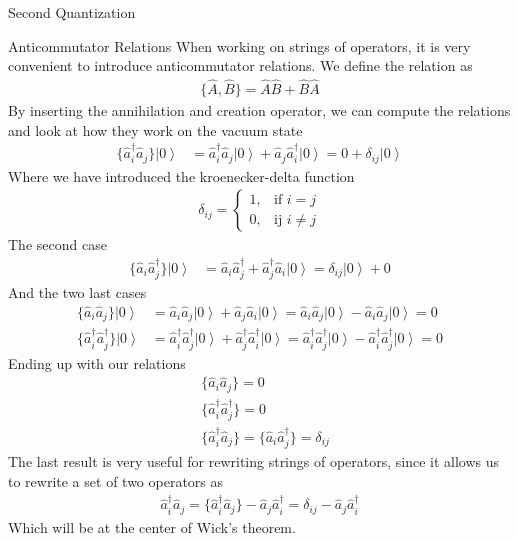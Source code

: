 \documentclass[twoside,english]{uiofysmaster}
\begin{document}
\begin{chapter}{Second Quantization}
	\begin{section}{Anticommutator Relations}
		When working on strings of operators, it is very convenient to introduce anticommutator relations. We define the relation as 
		\begin{align}
			\{ \hat A, \hat B \} = \hat A \hat B + \hat B \hat A	
		\end{align}
		By inserting the annihilation and creation operator, we can compute the relations and look at how they work on the vacuum state 
		\begin{align}
			\{ \hat a_i^\dagger \hat a_j \} \left| 0 \right>  &= \hat a_i^\dagger \hat a_j \left| 0 \right>  + \hat a_j \hat a_i^\dagger \left| 0 \right> = 0 + \delta_{ij} \left|0\right> 
 		\end{align}
 		Where we have introduced the kroenecker-delta function
 		\begin{align}
 			\delta_{ij} = \begin{cases}
 						1, & \text{if } i = j \\
 						0, & \text{ij } i \neq j
 						\end{cases}
 		\end{align}
		The second case
		\begin{align}
			\{ \hat a_i \hat a_j^\dagger \} \left| 0 \right> &= \hat a_i \hat a_j^\dagger + \hat a_j^\dagger \hat a_i \left| 0 \right> = \delta_{ij} \left| 0 \right> + 0
		\end{align}
		And the two last cases
 		\begin{align}
			\{ \hat a_i \hat a_j \} \left| 0 \right> &= \hat a_i \hat a_j \left| 0 \right> + \hat a_j \hat a_i \left| 0 \right> = \hat a_i \hat a_j \left| 0 \right> - \hat a_i \hat a_j \left| 0 \right> = 0\\
			\{ \hat a_i^\dagger \hat a_j^\dagger \} \left| 0 \right> &= \hat a_i^\dagger \hat a_j^\dagger \left| 0 \right> + \hat a_j^\dagger \hat a_i^\dagger \left| 0 \right> = \hat a_i^\dagger \hat a_j^\dagger \left| 0 \right> - \hat a_i^\dagger \hat a_j^\dagger \left| 0 \right> = 0
 		\end{align}
 		Ending up with our relations
 		\begin{align}
 			&\{ \hat a_i \hat a_j \} = 0 \\
 			&\{ \hat a_i^\dagger \hat a_j^\dagger \} = 0 \\
			&\{ \hat a_i^\dagger \hat a_j \} = \{ \hat a_i \hat a_j^\dagger \} = \delta_{ij}
		\end{align}
		The last result is very useful for rewriting strings of operators, since it allows us to rewrite a set of two operators as
		\begin{align}
			\hat a_i^\dagger \hat a_j = \{ \hat a_i^\dagger \hat a_j \} - \hat a_j \hat a_i^\dagger = \delta_{ij} - \hat a_j \hat a_i^\dagger 
			\label{interchange operators}
		\end{align}
		Which will be at the center of Wick's theorem. 
	\end{section}


\end{chapter}
\end{document}
